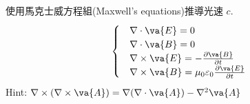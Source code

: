 \begin{problem}
使用馬克士威方程組(Maxwell's equations)推導光速 $c$.
$$
    \begin{cases}
         & \nabla \cdot \va{E} = 0                                                       \\
         & \nabla \cdot \va{B} = 0                                                       \\
         & \nabla \times \va{E} = -\frac{\partial\va{B}}{\partial t}                     \\
         & \nabla \times \va{B} = \mu_0\varepsilon_0 \frac{\partial \va{E}} {\partial t}
    \end{cases}
$$
Hint: $\nabla \times (\nabla \times \va{A}) = \nabla(\nabla \cdot \va{A}) - \nabla^2\va{A}$
\end{problem}

\begin{solve}
\end{solve}